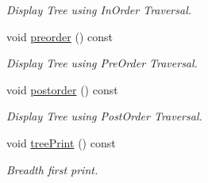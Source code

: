 \begin{DoxyCompactItemize}
\begin{DoxyCompactList}\small\item\em Display Tree using In\-Order Traversal. \end{DoxyCompactList}\item 
\hypertarget{classBinaryTree_a0e5191039f7c8d694347026e7d027ab7}{void \hyperlink{classBinaryTree_a0e5191039f7c8d694347026e7d027ab7}{preorder} () const }\label{classBinaryTree_a0e5191039f7c8d694347026e7d027ab7}

\begin{DoxyCompactList}\small\item\em Display Tree using Pre\-Order Traversal. \end{DoxyCompactList}\item 
\hypertarget{classBinaryTree_abdc1d9a98d834b07e13c11fdd73f8700}{void \hyperlink{classBinaryTree_abdc1d9a98d834b07e13c11fdd73f8700}{postorder} () const }\label{classBinaryTree_abdc1d9a98d834b07e13c11fdd73f8700}

\begin{DoxyCompactList}\small\item\em Display Tree using Post\-Order Traversal. \end{DoxyCompactList}\item 
\hypertarget{classBinaryTree_af3e70173e5c3cc529c944fb3f7c0784d}{void \hyperlink{classBinaryTree_af3e70173e5c3cc529c944fb3f7c0784d}{tree\-Print} () const }\label{classBinaryTree_af3e70173e5c3cc529c944fb3f7c0784d}

\begin{DoxyCompactList}\small\item\em Breadth first print. \end{DoxyCompactList}\end{DoxyCompactItemize}
